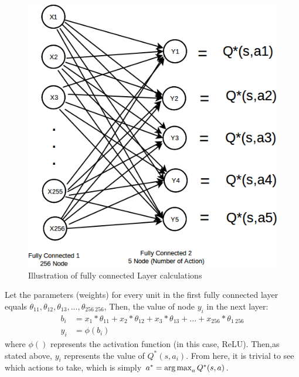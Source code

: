 \begin{enumerate}
\begin{figure}[H]
            \includegraphics[scale=0.5]{images/FCLayer.png}
            \caption{Illustration of fully connected Layer calculations}
            \label{fig:fclayer}
        \end{figure}
        Let the parameters (weights) for every unit in the first fully connected layer equals $\theta_{1 1},\theta_{1 2},\theta_{1 3}, ... , \theta_{256 \ 256} $, Then, the value of node $y_i$ in the next layer:
        \begin{align*}
            b_i&=x_1*\theta_{11}+x_2*\theta_{12}+x_3*\theta_{13}+...+x_{256}*\theta_{1 \ 256} \\
            y_i&=\phi(b_i)
        \end{align*}
        where $\phi()$ represents the activation function (in this case, ReLU). Then,as stated above, $y_i$ represents the value of $Q^*(s,a_i)$. From here, it is trivial to see which actions to take, which is simply $a^*=\operatorname*{arg\,max}_a Q^*(s,a)$. 
        \end{enumerate}
        
